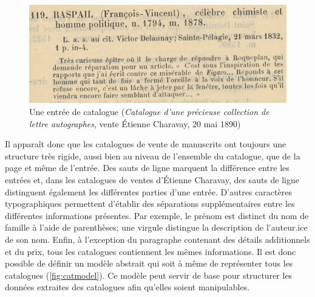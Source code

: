 \begin{figure}[h]
	\centering
	\includegraphics[width=\textwidth]{img/CAT_000441_e119}
	\caption{Une entrée de catalogue (\textit{Catalogue d'une précieuse collection de lettre autographes}, vente Étienne Charavay, 20 mai 1890)}
	\label{fig:catitem}
\end{figure}

Il apparaît donc que les catalogues de vente de manuscrits ont toujours une structure très rigide, aussi bien au niveau de l'ensemble du catalogue, que de la page et même de l'entrée. Des sauts de ligne marquent la différence entre les entrées et, dans les catalogues de ventes d'Étienne Charavay, des sauts de ligne distinguent également les différentes parties d'une entrée. D'autres caractères typographiques permettent d'établir des séparations supplémentaires entre les différentes informations présentes. Par exemple, le prénom est distinct du nom de famille à l'aide de parenthèses; une virgule distingue la description de l'auteur.ice de son nom. Enfin, à l'exception du paragraphe contenant des détails additionnels et du prix, tous les catalogues contiennent les mêmes informations. Il est donc possible de définir un modèle abstrait qui soit à même de représenter tous les catalogues (\ref{fig:catmodel}). Ce modèle peut servir de base pour structurer les données extraites des catalogues afin qu'elles soient manipulables.

